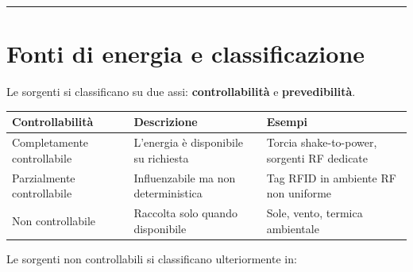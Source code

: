 \documentclass[
  italian,
  openany]{book}
\newcounter{none} %
\begin{document}
\begin{center}\rule{0.5\linewidth}{0.5pt}\end{center}

\section{Fonti di energia e
classificazione}\label{fonti-di-energia-e-classificazione}

Le sorgenti si classificano su due assi: \textbf{controllabilità} e
\textbf{prevedibilità}.

{\def\LTcaptype{none} %
\begin{longtable}[]{@{}
  >{\raggedright\arraybackslash}p{}
  >{\raggedright\arraybackslash}p{}
  >{\raggedright\arraybackslash}p{}@{}}
\toprule\noalign{}
\begin{minipage}[b]{\linewidth}\raggedright
Controllabilità
\end{minipage} & \begin{minipage}[b]{\linewidth}\raggedright
Descrizione
\end{minipage} & \begin{minipage}[b]{\linewidth}\raggedright
Esempi
\end{minipage} \\
\midrule\noalign{}
\endhead
\bottomrule\noalign{}
\endlastfoot
Completamente controllabile & L'energia è disponibile su richiesta &
Torcia shake-to-power, sorgenti RF dedicate \\
Parzialmente controllabile & Influenzabile ma non deterministica & Tag
RFID in ambiente RF non uniforme \\
Non controllabile & Raccolta solo quando disponibile & Sole, vento,
termica ambientale \\
\end{longtable}
}

Le sorgenti non controllabili si classificano ulteriormente in:
\end{document}

